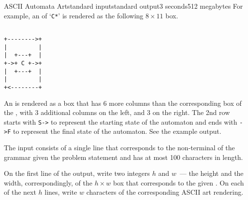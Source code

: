 \begin{problem}{ASCII Automata Art}{standard input}{standard output}{3 seconds}{512 megabytes}
For example, an  of `\texttt{C*}'
is rendered as the following $8 \times 11$ box. 

\begin{verbatim}
                 
+-------->+
|         |   
|  +---+  |   
+->+ C +->+   
|  +---+  |   
|         |   
+<--------+   
\end{verbatim}

An  is rendered as a box that has 6 more columns than the corresponding box of the , with 3 additional columns on the left, and 3 on the right. The 2nd row starts with \texttt{S->} to represent the starting state of the automaton and ends with \texttt{->F} to represent the final state of the automaton. See the example output.

\InputFile
The input consists of a single line that corresponds to the  non-terminal of the grammar given the problem statement and has at most 100 characters in length.

\OutputFile
On the first line of the output, write two integers $h$ and $w$~--- the height and the width, correspondingly, of the $h \times w$ box that corresponds to the given . On each of the next $h$ lines, write $w$ characters of the corresponding ASCII art rendering.


\Example

\begin{examplewide}
%
\end{examplewide}

\end{problem}

